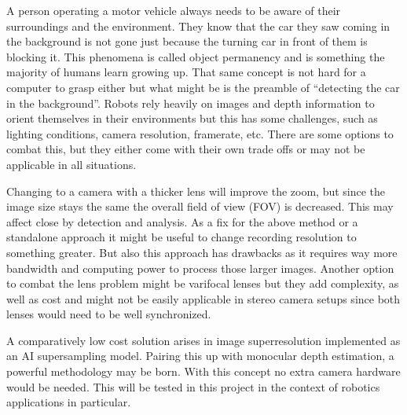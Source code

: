 A person operating a motor vehicle always needs to be aware of their surroundings and the environment. They know that the car they saw coming in the background is not gone just because the turning car in front of them is blocking it. This phenomena is called object permanency and is something the majority of humans learn growing up.
That same concept is not hard for a computer to grasp either but what might be is the preamble of \enquote{detecting the car in the background}. Robots rely heavily on images and depth information to orient themselves in their environments but this has some challenges, such as lighting conditions, camera resolution, framerate, etc.
There are some options to combat this, but they either come with their own trade offs or may not be applicable in all situations.

Changing to a camera with a thicker lens will improve the zoom, but since the image size stays the same the overall field of view (FOV) is decreased. This may affect close by detection and analysis.
As a fix for the above method or a standalone approach it might be useful to change recording resolution to something greater. But also this approach has drawbacks as it requires way more bandwidth and computing power to process those larger images.
Another option to combat the lens problem might be varifocal lenses but they add complexity, as well as cost and might not be easily applicable in stereo camera setups since both lenses would need to be well synchronized.

A comparatively low cost solution arises in image superresolution implemented as an AI supersampling model. Pairing this up with monocular depth estimation, a powerful methodology may be born. With this concept no extra camera hardware would be needed. This will be tested in this project in the context of robotics applications in particular.